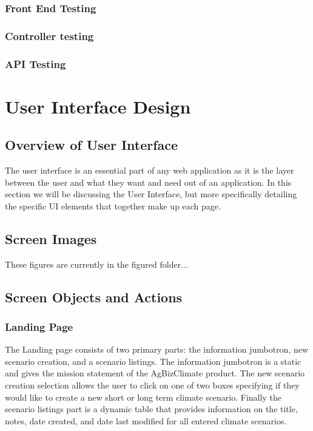 \documentclass[onecolumn, draftclsnofoot,10pt, compsoc]{article}
\begin{document}
		\subsubsection{Front End Testing}
	
		\subsubsection{Controller testing}
	
		\subsubsection{API Testing}
		
\section{User Interface Design}

	\subsection{Overview of User Interface}
	The user interface is an essential part of any web application as it is the layer between the user and what they want and need out of an application. In this section we will be discussing the User Interface, but more specifically detailing the specific UI elements that together make up each page.
	\subsection{Screen Images}
	These figures are currently in the figured folder...
	\subsection{Screen Objects and Actions}
		\subsubsection{Landing Page}
		The Landing page consists of two primary parts: the information jumbotron, new scenario creation, and a scenario listings. The information jumbotron is a static and gives the mission statement of the AgBizClimate product. The new scenario creation selection allows the user to click on one of two boxes specifying if they would like to create a new short or long term climate scenario. Finally the scenario listings part is a dynamic table that provides information on the title, notes, date created, and date last modified for all entered climate scenarios.
\end{document}
